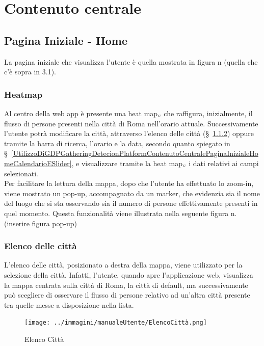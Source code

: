 \section{Contenuto centrale}\label{UtilizzoDiGDPGatheringDetecionPlatformContenutoCentrale}
\subsection{Pagina Iniziale - Home} \label{UtilizzoDiGDPGatheringDetecionPlatformContenutoCentralePaginaInizialeHome}
La pagina iniziale che visualizza l'utente è quella mostrata in figura n (quella che c'è sopra in 3.1). 
\subsubsection{Heatmap}\label{UtilizzoDiGDPGatheringDetecionPlatformContenutoCentralePaginaInizialeHomeHeatmap}
Al centro della web app è presente una heat map$_{\scaleto{G}{3pt}}$ che raffigura, inizialmente, il flusso di persone presenti nella città di Roma nell'orario attuale. Successivamente l'utente potrà modificare la città, attraverso l'elenco delle città (\S~\ref{UtilizzoDiGDPGatheringDetecionPlatformContenutoCentralePaginaInizialeHomeMenùATendina}) oppure tramite la barra di ricerca, l'orario e la data, secondo quanto spiegato in \S~\ref{UtilizzoDiGDPGatheringDetecionPlatformContenutoCentralePaginaInizialeHomeCalendarioESlider}, e visualizzare tramite la heat map$_{\scaleto{G}{3pt}}$ i dati relativi ai campi selezionati.\\
Per facilitare la lettura della mappa, dopo che l'utente ha effettuato lo zoom-in, viene mostrato un pop-up, accompagnato da un marker, che evidenzia sia il nome del luogo che si sta osservando sia il numero di persone effettivamente presenti in quel momento. Questa funzionalità viene illustrata nella seguente figura n. (inserire figura pop-up)
\subsubsection{Elenco delle città} \label{UtilizzoDiGDPGatheringDetecionPlatformContenutoCentralePaginaInizialeHomeMenùATendina}

L'elenco delle città, posizionato a destra della mappa, viene utilizzato per la selezione della città. Infatti, l'utente, quando apre l'applicazione web, visualizza la mappa centrata sulla città di Roma, la città di default, ma successivamente può scegliere di osservare il flusso di persone relativo ad un'altra città presente tra quelle messe a disposizione nella lista. 
\begin{center}
	\begin{figure}
		\texttt{[image: ../immagini/manualeUtente/ElencoCittà.png]}
		\caption{Elenco Città}
	\end{figure}
\end{center}

